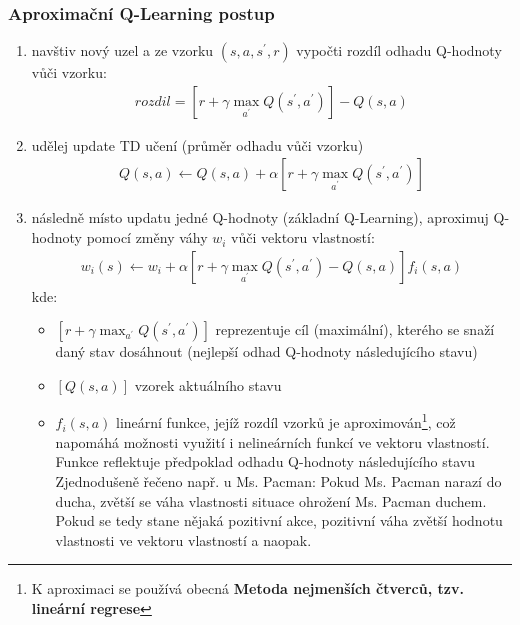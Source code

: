 \subsubsection{Aproximační Q-Learning postup}
\label{teorie:approxq}
\begin{enumerate}
  \item navštiv nový uzel a ze vzorku $(s,a,s^\prime,r)$ vypočti rozdíl odhadu Q-hodnoty vůči vzorku:
    \begin{align}
	\label{rov:approxq1}
     rozdil = \left [ r + \gamma \max_{a^\prime}Q(s^\prime,a^\prime) \right]  - Q(s,a) 
    \end{align}
  \item udělej update TD učení (průměr odhadu vůči vzorku)
    \begin{align}
	\label{rov:approxq2}
     Q(s,a) \leftarrow  Q(s,a) + \alpha \left [ r + \gamma \max_{a^\prime}Q(s^\prime,a^\prime) \right]
    \end{align}
  \item následně místo updatu jedné Q-hodnoty (základní Q-Learning), aproximuj Q-hodnoty pomocí změny váhy $w_i$ vůči vektoru vlastností:
    \begin{align}
	\label{rov:approxq3}
    w_i(s) \leftarrow w_i + \alpha \left [ r + \gamma \max_{a^\prime}Q(s^\prime,a^\prime) - Q(s,a) \right] f_i(s,a)
    \end{align}
    kde:
    \begin{itemize}
      \item $\left [ r + \gamma \max_{a^\prime}Q(s^\prime,a^\prime)\right] $ reprezentuje cíl (maximální), kterého se snaží daný stav dosáhnout (nejlepší odhad Q-hodnoty následujícího stavu)
      \item $\left [ Q(s,a)\right]$ vzorek aktuálního stavu
      \item $f_i(s,a)$ lineární funkce, jejíž rozdíl vzorků je aproximován\footnote{K aproximaci se používá obecná \textbf{Metoda nejmenších čtverců, tzv. lineární regrese}}, což napomáhá možnosti využití i nelineárních funkcí ve vektoru vlastností. Funkce reflektuje předpoklad odhadu Q-hodnoty následujícího stavu\newline
      Zjednodušeně řečeno např. u Ms. Pacman: Pokud Ms. Pacman narazí do ducha, zvětší se váha vlastnosti situace ohrožení Ms. Pacman duchem. Pokud se tedy stane nějaká pozitivní akce, pozitivní váha zvětší hodnotu vlastnosti ve vektoru vlastností a naopak.
    \end{itemize}

\end{enumerate}

